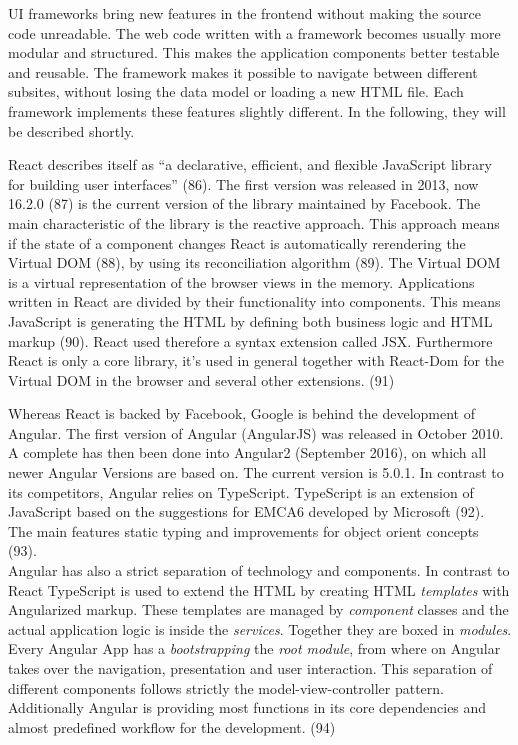 \documentclass[american,a4paper,oneside,,tablecaptionabove]{scrbook}
\begin{document}
UI frameworks bring new features in the frontend without making the
source code unreadable. The web code written with a framework becomes
usually more modular and structured. This makes the application
components better testable and reusable. The framework makes it possible
to navigate between different subsites, without losing the data model or
loading a new HTML file. Each framework implements these features
slightly different. In the following, they will be described shortly.

React describes itself as \enquote{a declarative, efficient, and
flexible JavaScript library for building user interfaces} (86). The
first version was released in 2013, now 16.2.0 (87) is the current
version of the library maintained by Facebook. The main characteristic
of the library is the reactive approach. This approach means if the
state of a component changes React is automatically rerendering the
Virtual DOM (88), by using its reconciliation algorithm (89). The
Virtual DOM is a virtual representation of the browser views in the
memory. Applications written in React are divided by their functionality
into components. This means JavaScript is generating the HTML by
defining both business logic and HTML markup (90). React used therefore
a syntax extension called JSX. Furthermore React is only a core library,
it's used in general together with React-Dom for the Virtual DOM in the
browser and several other extensions. (91)

Whereas React is backed by Facebook, Google is behind the development of
Angular. The first version of Angular (AngularJS) was released in
October 2010. A complete has then been done into Angular2 (September
2016), on which all newer Angular Versions are based on. The current
version is 5.0.1. In contrast to its competitors, Angular relies on
TypeScript. TypeScript is an extension of JavaScript based on the
suggestions for EMCA6 developed by Microsoft (92). The main features
static typing and improvements for object orient concepts (93).\\
Angular has also a strict separation of technology and components. In
contrast to React TypeScript is used to extend the HTML by creating HTML
\emph{templates} with Angularized markup. These templates are managed by
\emph{component} classes and the actual application logic is inside the
\emph{services}. Together they are boxed in \emph{modules}. Every
Angular App has a \emph{bootstrapping} the \emph{root module}, from
where on Angular takes over the navigation, presentation and user
interaction. This separation of different components follows strictly
the model-view-controller pattern. Additionally Angular is providing
most functions in its core dependencies and almost predefined workflow
for the development. (94)
\end{document}
